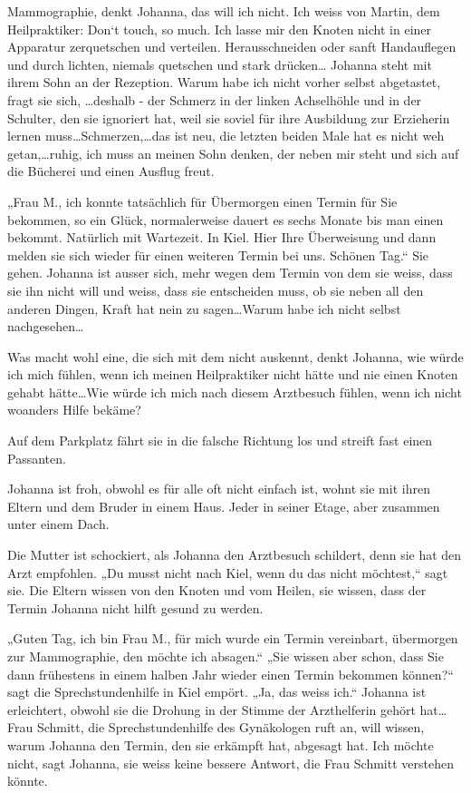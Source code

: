 \documentclass[10pt,titlepage,a5paper]{book}
\begin{document}
Mammographie, denkt Johanna, das will ich nicht. Ich weiss von Martin, dem  Heilpraktiker: Don`t touch, so much. Ich lasse mir den Knoten nicht in einer Apparatur zerquetschen und verteilen. Herausschneiden oder sanft Handauflegen und durch lichten, niemals quetschen und stark drücken\dots 
Johanna steht mit ihrem Sohn an der Rezeption. Warum habe ich nicht vorher selbst abgetastet, fragt sie sich, \dots deshalb - der Schmerz in der linken Achselhöhle und in der Schulter, den sie ignoriert hat, weil sie soviel für ihre Ausbildung zur Erzieherin lernen muss\dots  Schmerzen,\dots  das ist neu, die letzten beiden Male hat es nicht weh getan,\dots ruhig, ich muss an meinen Sohn denken, der neben mir steht und sich auf die Bücherei und einen Ausflug freut.

„Frau M., ich konnte tatsächlich für Übermorgen einen Termin für Sie bekommen, so ein Glück, normalerweise dauert es sechs Monate bis man einen bekommt. Natürlich mit Wartezeit. In Kiel. Hier Ihre Überweisung und dann melden sie sich wieder für einen weiteren Termin bei uns. Schönen Tag.“
Sie gehen. Johanna ist ausser sich, mehr wegen dem Termin von dem sie weiss, dass sie ihn nicht will und weiss, dass sie entscheiden muss, ob sie neben all den anderen Dingen, Kraft hat nein zu sagen\dots  Warum habe ich nicht selbst nachgesehen\dots 

Was macht wohl eine, die sich mit dem nicht auskennt, denkt Johanna, wie würde ich mich fühlen, wenn ich meinen Heilpraktiker nicht hätte und nie einen Knoten gehabt hätte\dots  Wie würde ich mich nach diesem Arztbesuch fühlen, wenn ich nicht woanders Hilfe bekäme?

Auf dem Parkplatz fährt sie in die falsche Richtung los und streift fast einen Passanten.

Johanna ist froh, obwohl es für alle oft nicht einfach ist, wohnt sie mit ihren Eltern und dem Bruder in einem Haus. Jeder in seiner Etage, aber zusammen unter einem Dach.

Die Mutter ist schockiert, als Johanna den Arztbesuch schildert, denn sie hat den Arzt empfohlen. „Du musst nicht nach Kiel, wenn du das nicht möchtest,“ sagt sie. Die Eltern wissen von den Knoten und vom Heilen, sie wissen, dass der Termin Johanna nicht hilft gesund zu werden.

„Guten Tag, ich bin Frau M., für mich wurde ein Termin vereinbart, übermorgen zur Mammographie, den möchte ich absagen.“ „Sie wissen aber schon, dass Sie dann frühestens in einem halben Jahr wieder einen Termin bekommen können?“ sagt die Sprechstundenhilfe in Kiel empört. „Ja, das weiss ich.“ Johanna ist erleichtert, obwohl sie die Drohung in der Stimme der Arzthelferin gehört hat\dots  Frau Schmitt, die Sprechstundenhilfe des Gynäkologen ruft an, will wissen, warum Johanna den Termin, den sie erkämpft hat, abgesagt hat. Ich möchte nicht, sagt Johanna, sie weiss keine bessere Antwort, die Frau Schmitt verstehen könnte.
\end{document}
